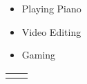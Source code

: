 \documentclass[a4paper]{article}
\begin{document}
    \begin{itemize}[itemsep=0.1\parskip]
        \item Playing Piano
        \item Video Editing
        \item Gaming
    \end{itemize}
    
    \mbox{}
    \vfill{
        \begin{flushright}
            \begin{tabular}{ c c }
                \bilishield{} & \gitshield{}
        \end{tabular}
        \end{flushright}
    }
\end{document}
